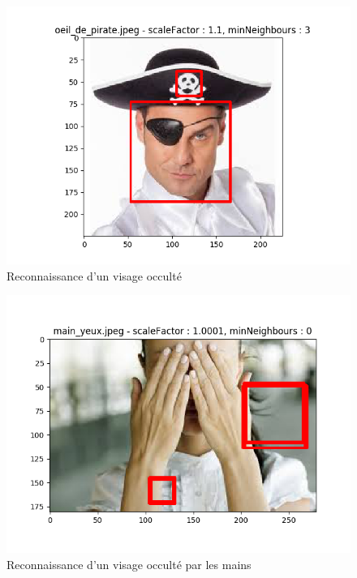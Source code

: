 \documentclass[a4paper,11pt]{article}
\begin{document}
	    \begin{figure}[H]
	        \begin{center}
		   \includegraphics[scale = 0.6]{images/oeil_de_pirate_1,1_3.png}
		   \caption{Reconnaissance d'un visage occulté}
		   \label{fig:pirate}
	        \end{center}
	    \end{figure}

	    \begin{figure}[H]
	        \begin{center}
		   \includegraphics[scale = 0.6]{images/main_yeux_1,0001_0.png}
		   \caption{Reconnaissance d'un visage occulté par les mains}
		   \label{fig:mains}
	        \end{center}
	    \end{figure}
\end{document}
